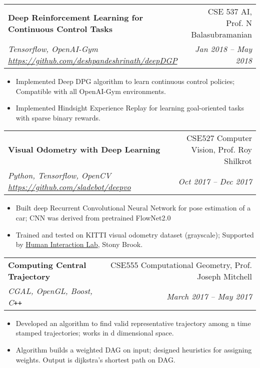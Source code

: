 \documentclass[letterpaper,10pt]{article}
\makeatletter
\newcommand{\resumeHeading}[4]{
  \vspace{-1pt}
    \begin{tabular*}{0.97\textwidth}{l@{\extracolsep{\fill}}r}
      \textbf{#1} & #2 \vspace{-2pt}\\ \vspace{1pt}
      \textit{\small#3} & \textit{\small #4} \\
    \end{tabular*}
}
\newcommand{\resumeItemListStart}{
\vspace{-7pt}
\begin{itemize}[leftmargin=14pt]
}
\newcommand{\resumeItemListEnd}{
\vspace{+7pt}
\end{itemize}
}
\newcommand{\resumeItem}[1]{
  \item\small{
      {#1 \vspace{-7pt}
      }
  }
}
\makeatother
\begin{document}
    \resumeHeading{Deep Reinforcement Learning for Continuous Control Tasks}{CSE 537 AI, Prof. N Balasubramanian}{Tensorflow, OpenAI-Gym \href{https://github.com/deshpandeshrinath/deepDGP}{https://github.com/deshpandeshrinath/deepDGP}}{Jan 2018 -- May 2018}
    \resumeItemListStart
      \resumeItem{Implemented Deep DPG algorithm to learn continuous control policies; Compatible with all OpenAI-Gym environments.}
      \resumeItem{Implemented Hindsight Experience Replay for learning goal-oriented tasks with sparse binary rewards.}
    \resumeItemListEnd


    \resumeHeading{Visual Odometry with Deep Learning}{CSE527 Computer Vision, Prof. Roy Shilkrot} {Python, Tensorflow, OpenCV \href{https://github.com/sladebot/deepvo}{https://github.com/sladebot/deepvo}}{Oct 2017 -- Dec 2017}
    \resumeItemListStart
      \resumeItem{Built deep Recurrent Convolutional Neural Network for pose estimation of a car; CNN was derived from pretrained FlowNet2.0}
      \resumeItem{Trained and tested on KITTI visual odometry dataset (grayscale); Supported by \href{http://hi.cs.stonybrook.edu/}{Human Interaction Lab}, Stony Brook.}
    \resumeItemListEnd


    \resumeHeading{Computing Central Trajectory}{CSE555 Computational Geometry, Prof. Joseph Mitchell}{CGAL, OpenGL, Boost, C\texttt{++}}{March 2017 -- May 2017}
    \resumeItemListStart
      \resumeItem{Developed an algorithm to find valid representative trajectory among n time stamped trajectories; works in d dimensional space.}
      \resumeItem{Algorithm builds a weighted DAG on input; designed heuristics for assigning weights. Output is dijkstra's shortest path on DAG.}
    \resumeItemListEnd
    \vspace{-10pt}
\end{document}
